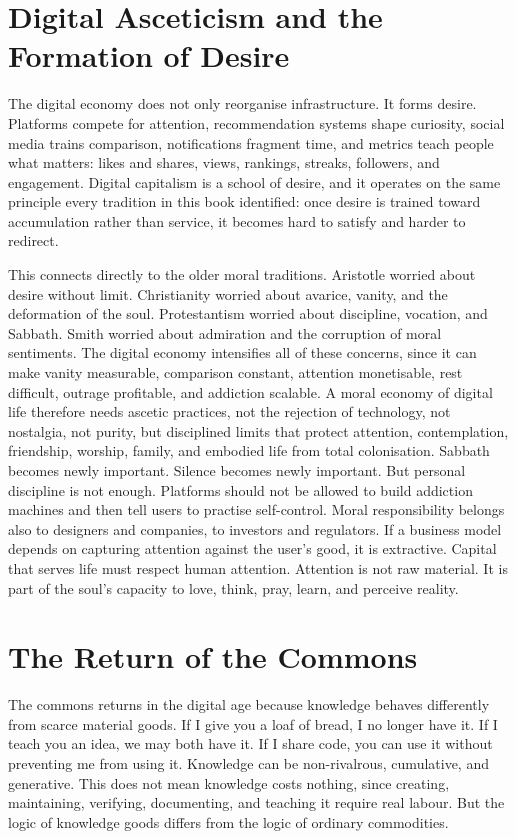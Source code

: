 \documentclass[11pt,a4paper,oneside]{book}
\begin{document}
\section*{Digital Asceticism and the Formation of Desire}

The digital economy does not only reorganise infrastructure. It forms desire. Platforms compete for attention, recommendation systems shape curiosity, social media trains comparison, notifications fragment time, and metrics teach people what matters: likes and shares, views, rankings, streaks, followers, and engagement. Digital capitalism is a school of desire, and it operates on the same principle every tradition in this book identified: once desire is trained toward accumulation rather than service, it becomes hard to satisfy and harder to redirect.

This connects directly to the older moral traditions. Aristotle worried about desire without limit. Christianity worried about avarice, vanity, and the deformation of the soul. Protestantism worried about discipline, vocation, and Sabbath. Smith worried about admiration and the corruption of moral sentiments. The digital economy intensifies all of these concerns, since it can make vanity measurable, comparison constant, attention monetisable, rest difficult, outrage profitable, and addiction scalable. A moral economy of digital life therefore needs ascetic practices, not the rejection of technology, not nostalgia, not purity, but disciplined limits that protect attention, contemplation, friendship, worship, family, and embodied life from total colonisation. Sabbath becomes newly important. Silence becomes newly important. But personal discipline is not enough. Platforms should not be allowed to build addiction machines and then tell users to practise self-control. Moral responsibility belongs also to designers and companies, to investors and regulators. If a business model depends on capturing attention against the user's good, it is extractive. Capital that serves life must respect human attention. Attention is not raw material. It is part of the soul's capacity to love, think, pray, learn, and perceive reality.

\section*{The Return of the Commons}

The commons returns in the digital age because knowledge behaves differently from scarce material goods. If I give you a loaf of bread, I no longer have it. If I teach you an idea, we may both have it. If I share code, you can use it without preventing me from using it. Knowledge can be non-rivalrous, cumulative, and generative. This does not mean knowledge costs nothing, since creating, maintaining, verifying, documenting, and teaching it require real labour. But the logic of knowledge goods differs from the logic of ordinary commodities.
\end{document}
